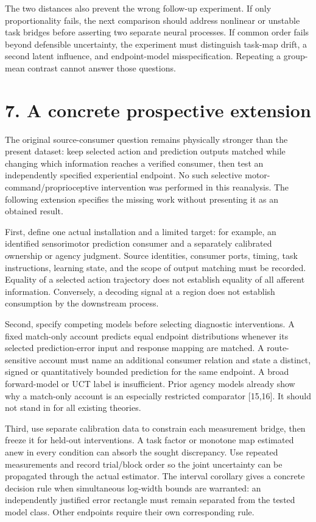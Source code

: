 \documentclass[
  11pt,
]{article}
\let\ctdoldsection\section
\renewcommand{\section}{\Needspace{8\baselineskip}\ctdoldsection}
\begin{document}
The two distances also prevent the wrong follow-up experiment. If only
proportionality fails, the next comparison should address nonlinear or
unstable task bridges before asserting two separate neural processes. If
common order fails beyond defensible uncertainty, the experiment must
distinguish task-map drift, a second latent influence, and
endpoint-model misspecification. Repeating a group-mean contrast cannot
answer those questions.

\hypertarget{a-concrete-prospective-extension}{%
\section{7. A concrete prospective
extension}\label{a-concrete-prospective-extension}}

The original source-consumer question remains physically stronger than
the present dataset: keep selected action and prediction outputs matched
while changing which information reaches a verified consumer, then test
an independently specified experiential endpoint. No such selective
motor-command/proprioceptive intervention was performed in this
reanalysis. The following extension specifies the missing work without
presenting it as an obtained result.

First, define one actual installation and a limited target: for example,
an identified sensorimotor prediction consumer and a separately
calibrated ownership or agency judgment. Source identities, consumer
ports, timing, task instructions, learning state, and the scope of
output matching must be recorded. Equality of a selected action
trajectory does not establish equality of all afferent information.
Conversely, a decoding signal at a region does not establish consumption
by the downstream process.

Second, specify competing models before selecting diagnostic
interventions. A fixed match-only account predicts equal endpoint
distributions whenever its selected prediction-error input and response
mapping are matched. A route-sensitive account must name an additional
consumer relation and state a distinct, signed or quantitatively bounded
prediction for the same endpoint. A broad forward-model or UCT label is
insufficient. Prior agency models already show why a match-only account
is an especially restricted comparator {[}15,16{]}. It should not stand
in for all existing theories.

Third, use separate calibration data to constrain each measurement
bridge, then freeze it for held-out interventions. A task factor or
monotone map estimated anew in every condition can absorb the sought
discrepancy. Use repeated measurements and record trial/block order so
the joint uncertainty can be propagated through the actual estimator.
The interval corollary gives a concrete decision rule when simultaneous
log-width bounds are warranted: an independently justified error
rectangle must remain separated from the tested model class. Other
endpoints require their own corresponding rule.
\end{document}
